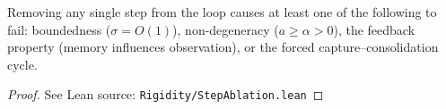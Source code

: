 \begin{proposition}
\label{prop:step_ablation}
\leanok
{}
Removing any single step from the loop causes at least one of the following to fail: boundedness ($\sigma = O(1)$), non-degeneracy ($a \geq \alpha > 0$), the feedback property (memory influences observation), or the forced capture--consolidation cycle.
\end{proposition}

\begin{proof}
\leanok
{}
See Lean source: \texttt{Rigidity/StepAblation.lean}
\end{proof}

